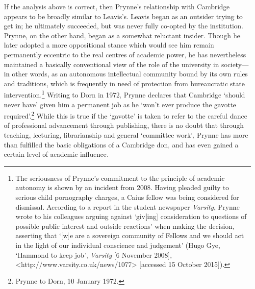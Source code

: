 \documentclass[]{article}
\begin{document}
If the analysis above is correct, then Prynne's relationship with
Cambridge appears to be broadly similar to Leavis's. Leavis began as an
outsider trying to get in; he ultimately succeeded, but was never fully
co-opted by the institution. Prynne, on the other hand, began as a
somewhat reluctant insider. Though he later adopted a more oppositional
stance which would see him remain permanently eccentric to the real
centres of academic power, he has nevertheless maintained a basically
conventional view of the role of the university in society---in other
words, as an autonomous intellectual community bound by its own rules
and traditions, which is frequently in need of protection from
bureaucratic state intervention.\footnote{The seriousness of Prynne's
  commitment to the principle of academic autonomy is shown by an
  incident from 2008. Having pleaded guilty to serious child pornography
  charges, a Caius fellow was being considered for dismissal. According
  to a report in the student newspaper \emph{Varsity}, Prynne wrote to
  his colleagues arguing against `giv{[}ing{]} consideration to
  questions of possible public interest and outside reactions' when
  making the decision, asserting that `{[}w{]}e are a sovereign
  community of Fellows and we should act in the light of our individual
  conscience and judgement' (Hugo Gye, `Hammond to keep job',
  \emph{Varsity} {[}6 November 2008{]},
  \textless{}http://www.varsity.co.uk/news/1077\textgreater{}
  {[}accessed 15 October 2015{]}).} Writing to Dorn in 1972, Prynne
declares that Cambridge `should never have' given him a permanent job as
he `won't ever produce the gavotte required'.\footnote{Prynne to Dorn,
  10 January 1972.} While this is true if the `gavotte' is taken to
refer to the careful dance of professional advancement through
publishing, there is no doubt that through teaching, lecturing,
librarianship and general `committee work', Prynne has more than
fulfilled the basic obligations of a Cambridge don, and has even gained
a certain level of academic influence.
\end{document}
